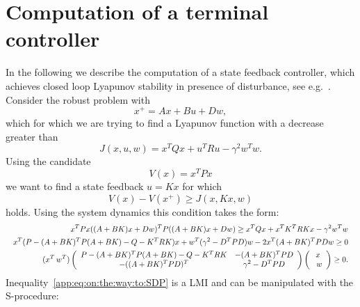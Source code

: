 
\chapter{Computation of a terminal controller}\label{app:terminal:controller}
In the following we describe the computation of a state feedback controller,
which achieves closed loop Lyapunov stability in presence of disturbance,
see e.g.~\cite{Boyd:94}.
%
Consider the robust problem with 
%
\begin{equation}
	x^+ = A x + B u + D w,
\end{equation}
%
which for which we are trying to find a Lyapunov function with a decrease greater than
%
\begin{equation}
	J(x,u,w) = x^TQx + u^TRu - \gamma^2 w^T w.
\end{equation}
%
Using the candidate
%
\begin{equation}
	V(x) = x^T P x
\end{equation}
%
we want to find a state feedback $u = Kx$ for which
%
\begin{equation}
	V(x) - V(x^+)\geq J(x,K x,w)
\end{equation}
%
holds. Using the system dynamics this condition takes the form:
%
\begin{equation}\label{app:eq:on:the:way:to:SDP}\Resize{\begin{split}
	x^T P x ((A+BK)x + Dw)^T P ((A+BK)x + Dw) \geq x^T Q x + x^T K^T R Kx - \gamma^2 w^T w\\
	x^T(P - (A+BK)^T P (A+BK) - Q - K^T R K)x + w^T(\gamma^2-D^T P D)w - 2 x^T(A+BK)^T P D w \geq 0\\
	(x^T\,w^T)\left(\begin{array}{cc}
	P - (A+BK)^T P (A+BK) - Q - K^T R K & -(A+BK)^T P D \\
	- ((A+BK)^T P D)^T & \gamma^2 - D^T P D
	\end{array}\right)\left(\begin{array}{c}
	x \\ w
	\end{array}\right)\geq 0 .
\end{split}}\end{equation}
%
Inequality~\eqref{app:eq:on:the:way:to:SDP} is a LMI and can be manipulated with the 
S-procedure:
%
